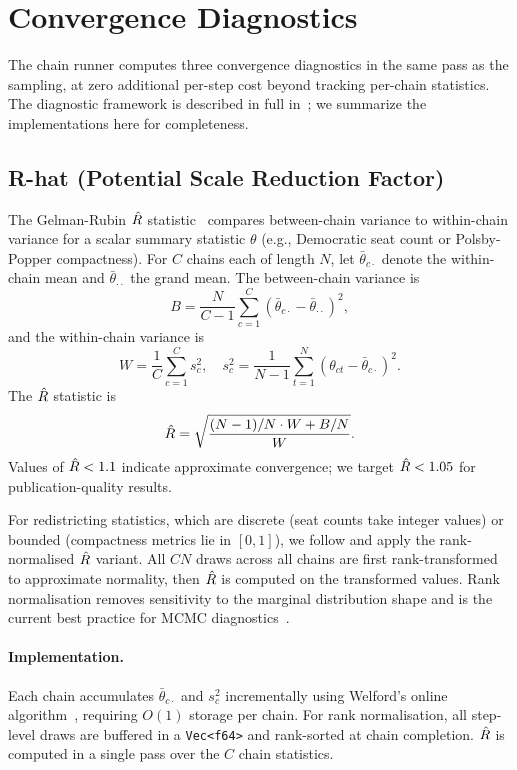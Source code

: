 \section{Convergence Diagnostics}
\label{sec:diagnostics}

The \re{} chain runner computes three convergence diagnostics in the
same pass as the sampling, at zero additional per-step cost beyond
tracking per-chain statistics.
The diagnostic framework is described in full in~\citet{dellaLibera2026g4};
we summarize the implementations here for completeness.

\subsection{R-hat (Potential Scale Reduction Factor)}

The Gelman-Rubin $\hat{R}$ statistic~\citep{gelman1992inference} compares
between-chain variance to within-chain variance for a scalar summary
statistic $\theta$ (e.g., Democratic seat count or Polsby-Popper
compactness).
For $C$ chains each of length $N$, let $\bar{\theta}_{c\cdot}$ denote
the within-chain mean and $\bar{\theta}_{\cdot\cdot}$ the grand mean.
The between-chain variance is
\[
  B = \frac{N}{C-1}\sum_{c=1}^C (\bar{\theta}_{c\cdot} - \bar{\theta}_{\cdot\cdot})^2,
\]
and the within-chain variance is
\[
  W = \frac{1}{C}\sum_{c=1}^C s_c^2,
  \quad s_c^2 = \frac{1}{N-1}\sum_{t=1}^N (\theta_{ct} - \bar{\theta}_{c\cdot})^2.
\]
The $\hat{R}$ statistic is
\[
  \hat{R} = \sqrt{\frac{(N-1)/N \cdot W + B/N}{W}}.
\]
Values of $\hat{R} < 1.1$ indicate approximate convergence; we target
$\hat{R} < 1.05$ for publication-quality results.

For redistricting statistics, which are discrete (seat counts take
integer values) or bounded (compactness metrics lie in $[0,1]$),
we follow \citet{vehtari2021rank} and apply the rank-normalised $\hat{R}$
variant.
All $CN$ draws across all chains are first rank-transformed to
approximate normality, then $\hat{R}$ is computed on the transformed values.
Rank normalisation removes sensitivity to the marginal distribution shape
and is the current best practice for MCMC diagnostics~\citep{vehtari2021rank}.

\paragraph{Implementation.}
Each chain accumulates $\bar{\theta}_{c\cdot}$ and $s_c^2$ incrementally
using Welford's online algorithm~\citep{welford1962note}, requiring $O(1)$
storage per chain.
For rank normalisation, all step-level draws are buffered in a
\texttt{Vec<f64>} and rank-sorted at chain completion.
$\hat{R}$ is computed in a single pass over the $C$ chain statistics.

